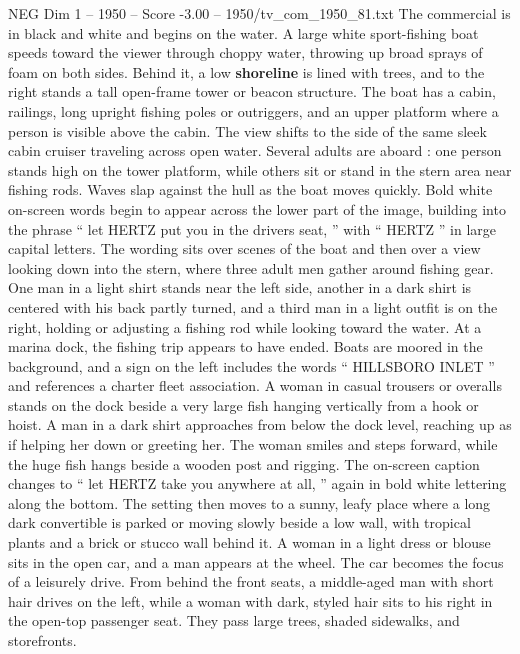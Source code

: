 \begin{textsample}{NEG Dim 1 – 1950 – Score -3.00 – 1950/tv\_com\_1950\_81.txt}  \label{ex:f1_neg_007}
The commercial is in black and white and begins on the water.
A large white sport-fishing boat speeds toward the viewer through choppy water, throwing up broad sprays of foam on both sides.
Behind it, a low \textbf{shoreline} is lined with trees, and to the right stands a tall open-frame tower or beacon structure.
The boat has a cabin, railings, long upright fishing poles or outriggers, and an upper platform where a person is visible above the cabin.
The view shifts to the side of the same sleek cabin cruiser traveling across open water.
Several adults are aboard : one person stands high on the tower platform, while others sit or stand in the stern area near fishing rods.
Waves slap against the hull as the boat moves quickly.
Bold white on-screen words begin to appear across the lower part of the image, building into the phrase “ let HERTZ put you in the drivers seat, ” with “ HERTZ ” in large capital letters.
The wording sits over scenes of the boat and then over a view looking down into the stern, where three adult men gather around fishing gear.
One man in a light shirt stands near the left side, another in a dark shirt is centered with his back partly turned, and a third man in a light outfit is on the right, holding or adjusting a fishing rod while looking toward the water.
At a marina dock, the fishing trip appears to have ended.
Boats are moored in the background, and a sign on the left includes the words “ HILLSBORO INLET ” and references a charter fleet association.
A woman in casual trousers or overalls stands on the dock beside a very large fish hanging vertically from a hook or hoist.
A man in a dark shirt approaches from below the dock level, reaching up as if helping her down or greeting her.
The woman smiles and steps forward, while the huge fish hangs beside a wooden post and rigging.
The on-screen caption changes to “ let HERTZ take you anywhere at all, ” again in bold white lettering along the bottom.
The setting then moves to a sunny, leafy place where a long dark convertible is parked or moving slowly beside a low wall, with tropical plants and a brick or stucco wall behind it.
A woman in a light dress or blouse sits in the open car, and a man appears at the wheel.
The car becomes the focus of a leisurely drive.
From behind the front seats, a middle-aged man with short hair drives on the left, while a woman with dark, styled hair sits to his right in the open-top passenger seat.
They pass large trees, shaded sidewalks, and storefronts.

\end{textsample}
